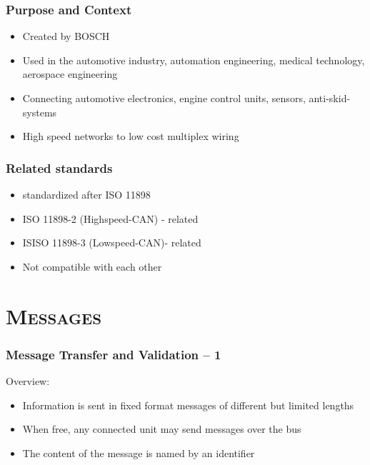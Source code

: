 \documentclass[xcolor=x11names,compress]{beamer}
\renewcommand{\(}{\begin{columns}}
\renewcommand{\)}{\end{columns}}
\newcommand{\<}[1]{\begin{column}{#1}}
\renewcommand{\>}{\end{column}}
\begin{document}
\begin{frame}
  \frametitle{Purpose and Context }
  \begin{itemize}
      \item Created by BOSCH
      \item Used in the automotive industry, automation engineering, medical technology, aerospace engineering
      \item Connecting automotive electronics, engine control units, sensors, anti-skid-systems
      \item High speed networks to low cost multiplex wiring
  \end{itemize}

\end{frame}

\begin{frame}
  \frametitle{Related standards}
  \begin{itemize}
      \item standardized after ISO 11898
      \item ISO 11898-2 (Highspeed-CAN) - related
      \item ISISO 11898-3 (Lowspeed-CAN)- related      
      \item Not compatible with each other
  \end{itemize}

\end{frame}

%


\section{\scshape Messages}
\begin{frame}
  \frametitle{Message Transfer and Validation -- 1}
  Overview:
  \begin{itemize}
    \item Information is sent in fixed format messages of different but limited lengths
    \item When free, any connected unit may send messages over the bus
    \item The content of the message is named by an identifier
  \end{itemize}

\end{frame}
\end{document}
